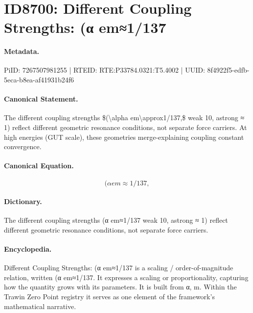 \section*{ID8700: Different Coupling Strengths: (α em≈1/137}
\paragraph{Metadata.}
PiID: 7267507981255 | RTEID: RTE:P33784.0321:T5.4002 | UUID: 8f4922f5-edfb-5eca-b8ea-af41931b24f6

\paragraph{Canonical Statement.}
The different coupling strengths \$(\textbackslash{}alpha em\textbackslash{}approx1/137,\$ weak 10, astrong ≈ 1) reflect different geometric resonance conditions, not separate force carriers. At high energies (GUT scale), these geometries merge-explaining coupling constant convergence.

\paragraph{Canonical Equation.}
\[
(\alpha em\approx1/137,
\]

\paragraph{Dictionary.}
The different coupling strengths (α em≈1/137 weak 10, astrong ≈ 1) reflect different geometric resonance conditions, not separate force carriers.

\paragraph{Encyclopedia.}
Different Coupling Strengths: (α em≈1/137 is a scaling / order-of-magnitude relation, written (α em≈1/137. It expresses a scaling or proportionality, capturing how the quantity grows with its parameters. It is built from α, m. Within the Trawin Zero Point registry it serves as one element of the framework's mathematical narrative.
